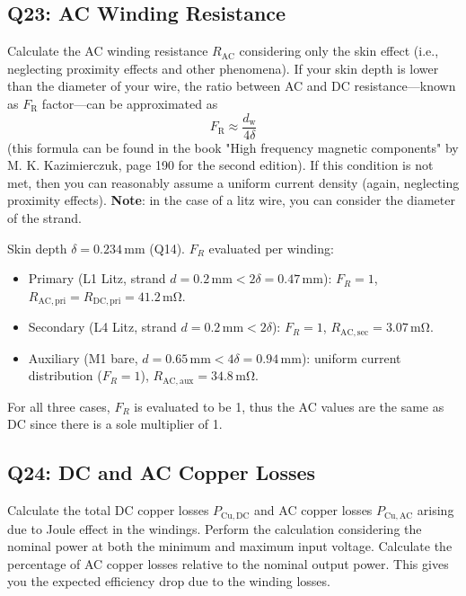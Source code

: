 \documentclass{PELsmallreport}
\begin{document}
\subsection{Q23: AC Winding Resistance} 
Calculate the AC winding resistance $R_\mathrm{AC}$ considering only the skin effect (i.e., neglecting proximity effects and other phenomena). 
If your skin depth is lower than the diameter of your wire, the ratio between AC and DC resistance---known as $F_\mathrm{R}$ factor---can be approximated as 
\begin{equation}
    F_\mathrm{R} \approx \frac{d_\mathrm{w}}{4\delta} 
\end{equation}
(this formula can be found in the book "High frequency magnetic components" by M. K. Kazimierczuk, page 190 for the second edition). 
If this condition is not met, then you can reasonably assume a uniform current density (again, neglecting proximity effects). 
\textbf{Note}: in the case of a litz wire, you can consider the diameter of the strand. 

\begin{framed}
	\vspace{2em}
	Skin depth $\delta=0.234\,\mathrm{mm}$ (Q14). $F_R$ evaluated per winding:
\begin{itemize}
    \item Primary (L1 Litz, strand $d=0.2\,\mathrm{mm}<2\delta=0.47\,\mathrm{mm}$): $F_R=1$, $R_\mathrm{AC,pri}=R_\mathrm{DC,pri}=41.2\,\mathrm{m\Omega}$.
    \item Secondary (L4 Litz, strand $d=0.2\,\mathrm{mm}<2\delta$): $F_R=1$, $R_\mathrm{AC,sec}=3.07\,\mathrm{m\Omega}$.
    \item Auxiliary (M1 bare, $d=0.65\,\mathrm{mm}<4\delta=0.94\,\mathrm{mm}$): uniform current distribution ($F_R=1$), $R_\mathrm{AC,aux}=34.8\,\mathrm{m\Omega}$.
\end{itemize}

For all three cases, \(F_R\) is evaluated to be 1, thus the AC values are the same as DC since there is a sole multiplier of 1.
	\vspace{2em}
\end{framed}

 \quad {} \quad {} \hfill{}






\subsection{Q24: DC and AC Copper Losses} 
Calculate the total DC copper losses $P_\mathrm{Cu,DC}$ and AC copper losses $P_\mathrm{Cu,AC}$ arising due to Joule effect in the windings. 
Perform the calculation considering the nominal power at both the minimum and maximum input voltage. 
Calculate the percentage of AC copper losses relative to the nominal output power. 
This gives you the expected efficiency drop due to the winding losses. 
\end{document}
